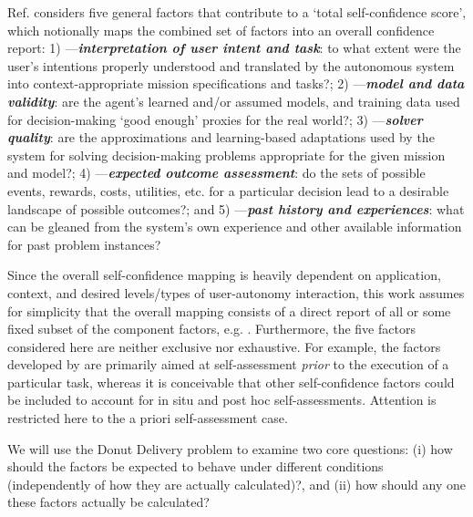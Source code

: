     Ref. \cite{Aitken2016-cv} considers five general factors that contribute to a `total self-confidence score', which notionally maps the combined set of factors into an overall confidence report:
    1) \xI---\textit{\textbf{interpretation of user intent and task}}: to what extent were the user's intentions properly understood and translated by the autonomous system into context-appropriate mission specifications and tasks?; 
    2) \xM---\textit{\textbf{model and data validity}}: are the agent's learned and/or assumed models, and training data used for decision-making `good enough' proxies for the real world?; 
    3) \xQ---\textit{\textbf{solver quality}}: are the approximations and learning-based adaptations used by the system for solving decision-making problems appropriate for the given mission and model?; 
    4) \xO---\textit{\textbf{expected outcome assessment}}: do the sets of possible events, rewards, costs, utilities, etc. for a particular decision lead to a desirable landscape of possible outcomes?; and 
    5) \xP---\textit{\textbf{past history and experiences}}: what can be gleaned from the system's own experience and other available information for past problem instances? %

    Since the overall self-confidence mapping is heavily dependent on application, context, and desired levels/types of user-autonomy interaction, this work assumes for simplicity that the overall mapping consists of a direct report of all or some fixed subset of the component factors, e.g. \xSC. 
    Furthermore, the five factors considered here are neither exclusive nor exhaustive. For example, the factors developed by \cite{Aitken2016-cv} are primarily aimed at self-assessment \emph{prior} to the execution of a particular task, whereas it is conceivable that other self-confidence factors could be included to account for in situ and post hoc self-assessments. Attention is restricted here to the a priori self-assessment case. 

We will use the Donut Delivery problem to examine two core questions: (i) how should the factors be expected to behave under different conditions (independently of how they are actually calculated)?, and (ii) how should any one these factors actually be calculated?

